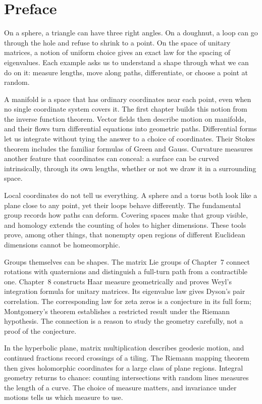 \chapter*{Preface}

On a sphere, a triangle can have three right angles. On a doughnut, a loop
can go through the hole and refuse to shrink to a point. On the space of
unitary matrices, a notion of uniform choice gives an exact law for the
spacing of eigenvalues. Each example asks us to understand a shape through
what we can do on it: measure lengths, move along paths, differentiate, or
choose a point at random.

A manifold is a space that has ordinary coordinates near each point, even
when no single coordinate system covers it. The first chapter builds this
notion from the inverse function theorem. Vector fields then describe
motion on manifolds, and their flows turn differential equations into
geometric paths. Differential forms let us integrate without tying the
answer to a choice of coordinates. Their Stokes theorem includes the
familiar formulas of Green and Gauss. Curvature measures another feature
that coordinates can conceal: a surface can be curved intrinsically,
through its own lengths, whether or not we draw it in a surrounding space.

Local coordinates do not tell us everything. A sphere and a torus both
look like a plane close to any point, yet their loops behave differently.
The fundamental group records how paths can deform. Covering spaces make
that group visible, and homology extends the counting of holes to higher
dimensions. These tools prove, among other things, that nonempty open
regions of different Euclidean dimensions cannot be homeomorphic.

Groups themselves can be shapes. The matrix Lie groups of Chapter~7
connect rotations with quaternions and distinguish a full-turn path from
a contractible one. Chapter~8 constructs Haar measure geometrically and
proves Weyl's integration formula for unitary matrices. Its eigenvalue
law gives Dyson's pair correlation. The corresponding law for zeta zeros
is a conjecture in its full form; Montgomery's theorem establishes a
restricted result under the Riemann hypothesis. The connection is a reason
to study the geometry carefully, not a proof of the conjecture.

In the hyperbolic plane, matrix multiplication describes geodesic motion,
and continued fractions record crossings of a tiling. The Riemann mapping
theorem then gives holomorphic coordinates for a large class of plane
regions. Integral geometry returns to chance: counting intersections with
random lines measures the length of a curve. The choice of measure matters,
and invariance under motions tells us which measure to use.

